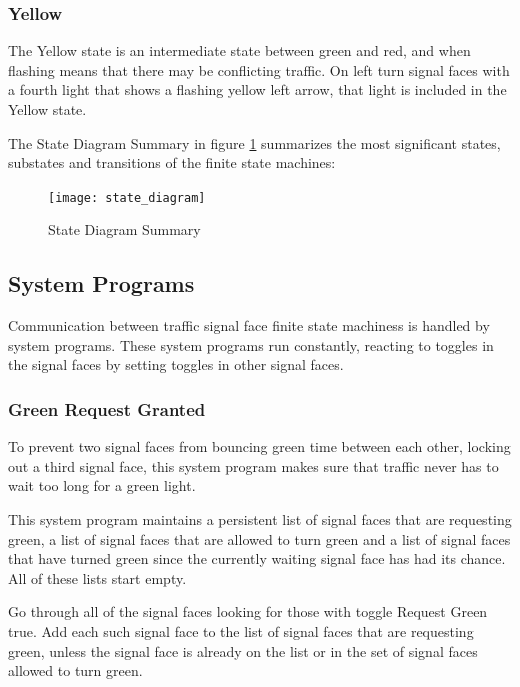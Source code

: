 \documentclass[letterpaper,twoside]{article}
\begin{document}


\subsubsection{Yellow}
The Yellow state is an intermediate state between green and red, and when
flashing means that there may be conflicting traffic.  On left turn signal
faces with a fourth light that shows a flashing yellow left arrow, that
light is included in the Yellow state.



The State Diagram Summary in figure \ref{fig:State_Diagram_Summary}
summarizes the most significant states, substates and
transitions of the finite state machines:

\begin{figure}[htb]
  {\texttt{[image: state\_diagram]}}
  {\caption{State Diagram Summary}\label{fig:State_Diagram_Summary}}
\end{figure}

\subsection{System Programs}

Communication between traffic signal face finite state machiness is handled by
system programs.
These system programs run constantly, reacting to toggles in the
signal faces by setting toggles in other signal faces.

\subsubsection{Green Request Granted}

To prevent two signal faces from bouncing green time between each other,
locking out a third signal face, this system program makes sure that
traffic never has to wait too long for a green light.

This system program maintains a persistent list of signal faces that are
requesting green,
a list of signal faces that are allowed to turn green and a list of signal
faces that have turned green since the currently waiting signal face
has had its chance.
All of these lists start empty.

Go through all of the signal faces looking for those with toggle Request
Green true.  Add each such signal face to the list of
signal faces that are requesting green, unless the signal face is already on
the list or in the set of signal faces allowed to turn green.
\end{document}
